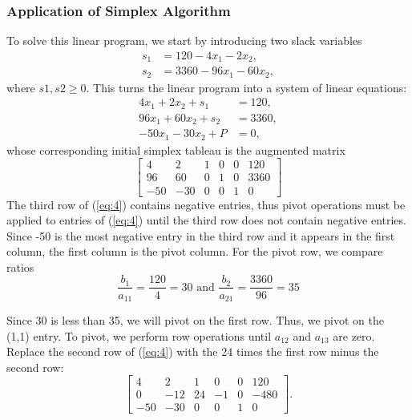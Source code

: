 \documentclass[letterpaper,11pt]{article}
\begin{document}
\subsubsection*{Application of Simplex Algorithm}
To solve this linear program, we start by introducing two slack variables
\begin{align*}
s_1 &= 120 - 4x_1 - 2x_2, \\
s_2 &= \num[group-separator={,}]{3360} - 96x_1 - 60x_2,
\end{align*}
where $s1, s2 \geq 0$. This turns the linear program into a system of linear equations:
\begin{align*}
4x_1 + 2x_2 + s_1 &= 120,\\
96x_1 + 60x_2 + s_2 &= \num[group-separator={,}]{3360},\\
-50x_1 - 30x_2 + P &= 0,
\end{align*}
whose corresponding initial simplex tableau is the augmented matrix
\begin{equation}
\begin{bmatrix} \label{eq:4}
4 & 2 & 1 & 0 & 0 & 120\\
96 & 60 & 0 & 1 & 0 & \num[group-separator={,}]{3360}\\
-50 & -30 & 0 & 0 & 1 & 0
\end{bmatrix}
\end{equation}
The third row of (\ref{eq:4}) contains negative entries, thus pivot operations must be applied to entries of (\ref{eq:4}) until the third row does not contain negative entries. Since -50 is the most negative entry in the third row and it appears in the first column, the first column is the pivot column. For the pivot row, we compare ratios
\begin{equation*}
\frac{b_1}{a_{11}}=\frac{120}{4}=30  \mbox{ and }  \frac{b_2}{a_{21}}=\frac{\num[group-separator={,}]{3360}}{96}=35
\end{equation*}

\noindent Since 30 is less than 35, we will pivot on the first row.  Thus, we pivot on the (1,1) entry. To pivot, we perform row operations until $a_{12}$ and $a_{13}$ are zero. Replace the second row of (\ref{eq:4}) with the 24 times the first row minus  the second row:
\begin{equation}
\begin{bmatrix} \label{eq:5}
4 & 2 & 1 & 0 & 0 & 120\\
0 & -12 & 24 & -1 & 0 & -480\\
-50 & -30 & 0 & 0 & 1 & 0
\end{bmatrix}.
\end{equation}
\end{document}
